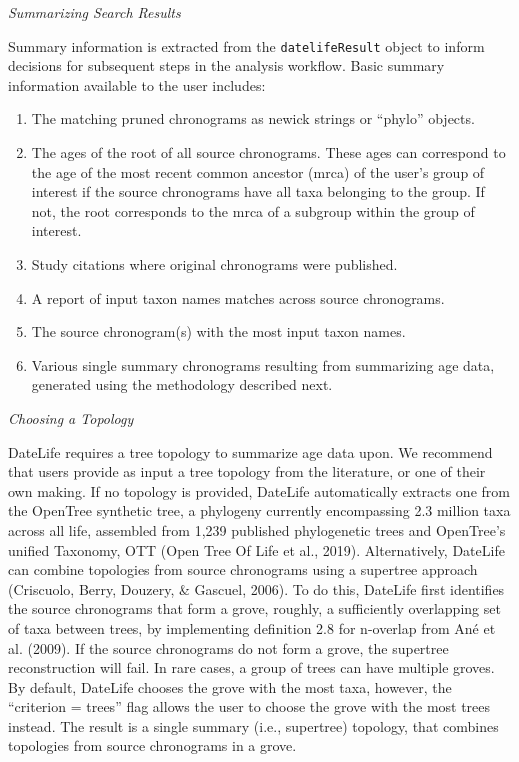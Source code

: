 \documentclass[english,man]{apa6}
\providecommand{\tightlist}{%
  \setlength{\itemsep}{0pt}\setlength{\parskip}{0pt}}
\begin{document}
\begin{center}
\emph{Summarizing Search Results}
\end{center}

Summary information is extracted from the \texttt{datelifeResult} object to inform decisions for subsequent steps in the analysis workflow. Basic summary information available to the user includes:

\begin{enumerate}
\def\labelenumi{\arabic{enumi}.}
\tightlist
\item
  The matching pruned chronograms as newick strings or \enquote{phylo} objects.
\item
  The ages of the root of all source chronograms. These ages can correspond to the age of the most recent common ancestor (mrca) of the user's group of interest if the source chronograms have all taxa belonging to the group. If not, the root corresponds to the mrca of a subgroup within the group of interest.
\item
  Study citations where original chronograms were published.
\item
  A report of input taxon names matches across source chronograms.
\item
  The source chronogram(s) with the most input taxon names.
\item
  Various single summary chronograms resulting from summarizing age data, generated using the methodology described next.
\end{enumerate}

\begin{center}
\emph{Choosing a Topology}
\end{center}

DateLife requires a tree topology to summarize age data upon.
We recommend that users provide as input a tree topology from the literature, or one of their own making. If no topology is provided, DateLife automatically extracts one from the OpenTree synthetic tree, a phylogeny currently encompassing 2.3 million taxa across all life, assembled from 1,239 published phylogenetic trees and OpenTree's unified Taxonomy, OTT (Open Tree Of Life et al., 2019).
Alternatively, DateLife can combine topologies from source chronograms using a supertree approach (Criscuolo, Berry, Douzery, \& Gascuel, 2006).
To do this, DateLife first identifies the source chronograms that form a grove, roughly, a sufficiently overlapping set of taxa between trees, by implementing definition 2.8 for n-overlap from Ané et al. (2009).
If the source chronograms do not form a grove, the supertree reconstruction will fail.
In rare cases, a group of trees can have multiple groves. By default, DateLife chooses the grove with the most taxa, however, the \enquote{criterion = trees} flag allows the user to choose the grove with the most trees instead.
The result is a single summary (i.e., supertree) topology, that combines topologies from source chronograms in a grove.
\end{document}

